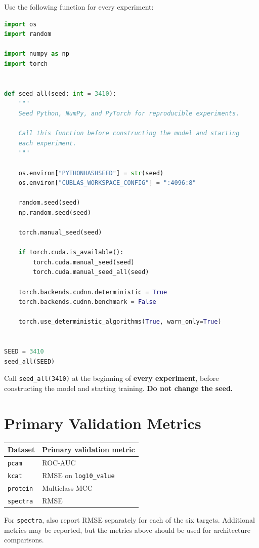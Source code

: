 \documentclass[11pt,a4paper]{article}
\newcommand{\code}[1]{\texttt{#1}}
\begin{document}
Use the following function for every experiment:

\begin{lstlisting}[language=Python]
import os
import random

import numpy as np
import torch


def seed_all(seed: int = 3410):
    """
    Seed Python, NumPy, and PyTorch for reproducible experiments.

    Call this function before constructing the model and starting
    each experiment.
    """

    os.environ["PYTHONHASHSEED"] = str(seed)
    os.environ["CUBLAS_WORKSPACE_CONFIG"] = ":4096:8"

    random.seed(seed)
    np.random.seed(seed)

    torch.manual_seed(seed)

    if torch.cuda.is_available():
        torch.cuda.manual_seed(seed)
        torch.cuda.manual_seed_all(seed)

    torch.backends.cudnn.deterministic = True
    torch.backends.cudnn.benchmark = False

    torch.use_deterministic_algorithms(True, warn_only=True)


SEED = 3410
seed_all(SEED)
\end{lstlisting}

Call \code{seed\_all(3410)} at the beginning of \textbf{every experiment}, before constructing the model and starting training. \textbf{Do not change the seed.}

\section{Primary Validation Metrics}

\begin{center}
\begin{tabular}{ll}
\toprule
\textbf{Dataset} & \textbf{Primary validation metric} \\
\midrule
\code{pcam} & ROC-AUC \\
\code{kcat} & RMSE on \code{log10\_value} \\
\code{protein} & Multiclass MCC \\
\code{spectra} & RMSE \\
\bottomrule
\end{tabular}
\end{center}

For \code{spectra}, also report RMSE separately for each of the six targets. Additional metrics may be reported, but the metrics above should be used for architecture comparisons.
\end{document}
